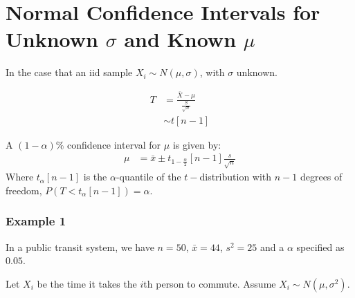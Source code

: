             \section{Normal Confidence Intervals for Unknown $\sigma$ and Known $\mu$} %
            \label{sec:normal_confidence_intervals_for_unknown_}
                In the case that an iid sample $X_i \sim N(\mu, \sigma)$, with $\sigma$ unknown.

                \begin{align*}
                    T &= \frac{\bar{X} - \mu}{\frac{S}{\sqrt{n}}} \\
                    &\sim t[n-1]
                \end{align*}

                A $(1 - \alpha)\%$ confidence interval for $\mu$ is given by:
                \begin{align*}
                    \mu &= \bar{x} \pm t_{1 - \frac{\alpha}{2}}[n-1] \frac{s}{\sqrt{n}}
                \end{align*}
                Where $t_\alpha[n-1]$ is the $\alpha$-quantile of the $t-$distribution with $n-1$ degrees of freedom, $P(T < t_\alpha[n-1]) = \alpha$.
                \subsubsection{Example 1} %
                \label{ssub:example_1}
                    In a public transit system, we have $n = 50$, $\bar{x} = 44$, $s^2 = 25$ and a $\alpha$ specified as $0.05$.

                    Let $X_i$ be the time it takes the $i$th person to commute. Assume $X_i \sim N(\mu, \sigma^2)$.

